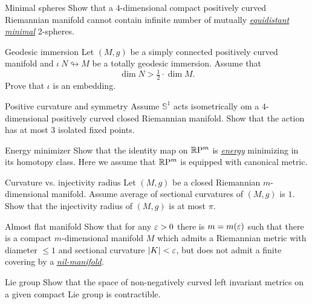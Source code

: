 \documentclass[twoside]{book}
\begin{document}
\begin{pr}{}{Minimal spheres}\label{Minimal spheres}
Show that a 
$4$-dimensional
compact 
positively curved 
Riemannian manifold 
cannot contain infinite number of  mutually
 \hyperref[Equidistant subsets]{\emph{equidistant}} \hyperref[Minimal surface]{\emph{minimal}} 2-spheres.
\end{pr}

\begin{pr}{\hard}{Geodesic immersion}
\label{Geodesic immersion}
Let $(M,g)$ be a simply connected positively curved manifold and $\iota\:N\looparrowright M$ be a totally geodesic immersion.
Assume that 
\[\dim N>\tfrac 12\cdot \dim M.\]
Prove that $\iota$ is an embedding.
\end{pr}



\begin{pr}{\thm}{Positive curvature and symmetry}\label{kleiner-hopf} 
Assume $\mathbb S^1$ acts isometrically om a $4$-dimensional positively curved closed Riemannian manifold.
Show that the action 
has at most $3$ isolated fixed points.
\end{pr}

\begin{pr}{}{Energy minimizer}\label{Energy minimizer}
Show that the identity map on $\mathbb{R}\mathrm{P}^m$ is 
\hyperref[Energy functional]{\emph{energy}}
minimizing in its homotopy class.
Here we assume that $\mathbb{R}\mathrm{P}^m$ is equipped with canonical metric.
\end{pr}

\begin{pr}{\thm}{Curvature vs. injectivity radius}\label{scalar-curv} 
Let $(M,g)$ be a closed 
Riemannian $m$-dimensional manifold.
Assume average of sectional curvatures of $(M,g)$ is $1$. 
Show that the injectivity radius of $(M,g)$ is at most $\pi$.
\end{pr}

\begin{pr}{}{Almost flat manifold}\label{almost-flat}
Show that for any $\varepsilon>0$ there is $m=m(\varepsilon)$ such that there is a compact
$m$-dimensional manifold $M$ which admits a Riemannian metric with diameter $\le 1$ and sectional
curvature $|K|<\varepsilon$,
but does not admit a finite covering by a \hyperref[Nil-manifolds]{\emph{nil-manifold}}.
\end{pr}

\begin{pr}{\easy}{Lie group}\label{lie-nonneg}
Show that the space of non-negatively curved left invariant metrics 
on a given compact Lie group is contractible.
\end{pr}
\end{document}
